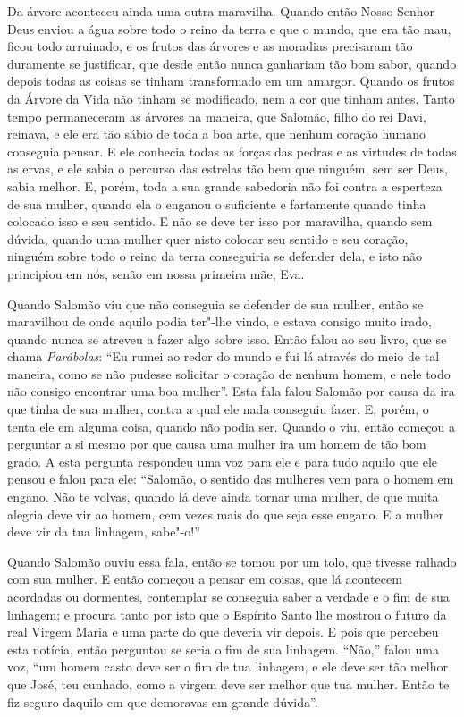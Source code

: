 Da árvore aconteceu ainda uma outra maravilha. Quando então Nosso Senhor Deus
enviou a água sobre todo o reino da terra e que o mundo, que era tão mau, ficou
todo arruinado, e os frutos das árvores e as moradias precisaram tão duramente
se justificar, que desde então nunca ganhariam tão bom sabor, quando depois
todas as coisas se tinham transformado em um amargor. Quando os frutos da
Árvore da Vida não tinham se modificado, nem a cor que tinham antes. Tanto
tempo permaneceram as árvores na maneira, que Salomão, filho do rei Davi,
reinava, e ele era tão sábio de toda a boa arte, que nenhum coração humano
conseguia pensar. E ele conhecia todas as forças das pedras e as virtudes de
todas as ervas, e ele sabia o percurso das estrelas tão bem que ninguém, sem
ser Deus, sabia melhor. E, porém, toda a sua grande sabedoria não foi contra a
esperteza de sua mulher, quando ela o enganou o suficiente e fartamente quando
tinha colocado isso e seu sentido. E não se deve ter isso por maravilha, quando
sem dúvida, quando uma mulher quer nisto colocar seu sentido e seu coração,
ninguém sobre todo o reino da terra conseguiria se defender dela, e isto não
principiou em nós, senão em nossa primeira mãe, Eva. 

Quando Salomão viu que não conseguia se defender de sua mulher, então se
maravilhou de onde aquilo podia ter"-lhe vindo, e estava consigo muito irado,
quando nunca se atreveu a fazer algo sobre isso. Então falou ao seu livro, que
se chama \textit{Parábolas}: “Eu rumei ao redor do mundo e fui lá através do
meio de tal maneira, como se não pudesse solicitar o coração de nenhum homem, e
nele todo não consigo encontrar uma boa mulher”. Esta fala falou Salomão por
causa da ira que tinha de sua mulher, contra a qual ele nada conseguiu fazer.
E, porém, o tenta ele em alguma coisa, quando não podia ser. Quando o viu,
então começou a perguntar a si mesmo por que causa uma mulher ira um homem de
tão bom grado. A esta pergunta respondeu uma voz para ele e para tudo aquilo
que ele pensou e falou para ele: “Salomão, o sentido das mulheres vem para o
homem em engano. Não te volvas, quando lá deve ainda tornar uma mulher, de que
muita alegria deve vir ao homem, cem vezes mais do que seja esse engano. E a
mulher deve vir da tua linhagem, sabe"-o!” 

Quando Salomão ouviu essa fala, então se tomou por um tolo, que tivesse ralhado
com sua mulher. E então começou a pensar em coisas, que lá acontecem acordadas
ou dormentes, contemplar se conseguia saber a verdade e o fim de sua linhagem;
e procura tanto por isto que o Espírito Santo lhe mostrou o futuro da real
Virgem Maria e uma parte do que deveria vir depois. E pois que percebeu esta
notícia, então perguntou se seria o fim de sua linhagem. “Não,” falou uma voz,
“um homem casto deve ser o fim de tua linhagem, e ele deve ser tão melhor que
José, teu cunhado, como a virgem deve ser melhor que tua mulher. Então te fiz
seguro daquilo em que demoravas em grande dúvida”. 

